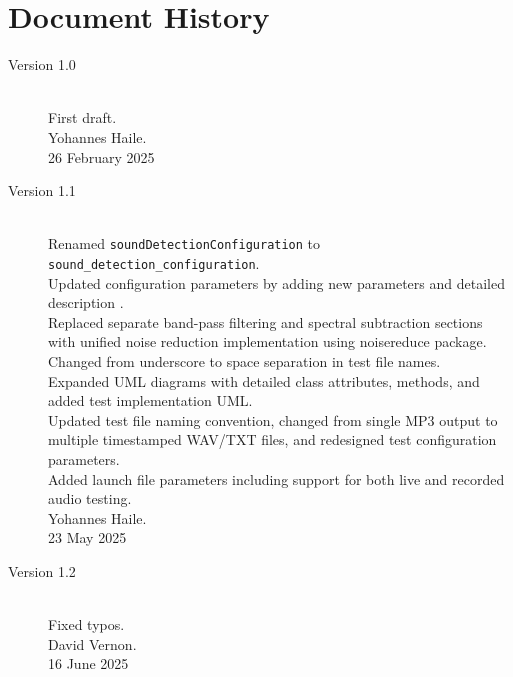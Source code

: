 \documentclass{CSSRforAfrica}
\begin{document}
  
\newpage
\section*{Document History}
\label{document_history}

\begin{description}

\item [Version 1.0]~\\
First draft. \\
Yohannes Haile. \\        
26 February 2025   

\item [Version 1.1]~\\
Renamed \texttt{soundDetectionConfiguration} to \texttt{sound\_detection\_configuration}. \\
Updated configuration parameters by adding new parameters and detailed description .\\
Replaced separate band-pass filtering and spectral subtraction sections with unified noise reduction implementation using noisereduce package.\\
Changed from underscore to space separation in test file names.\\
Expanded UML diagrams with detailed class attributes, methods, and added test implementation UML.\\
Updated test file naming convention, changed from single MP3 output to multiple timestamped WAV/TXT files, and redesigned test configuration parameters.\\
Added launch file parameters including support for both live and recorded audio testing.\\
Yohannes Haile. \\
23 May 2025                                          

\item [Version 1.2]~\\
Fixed typos. \\
David Vernon. \\       
16 June 2025   


\end{description}
\end{document}
